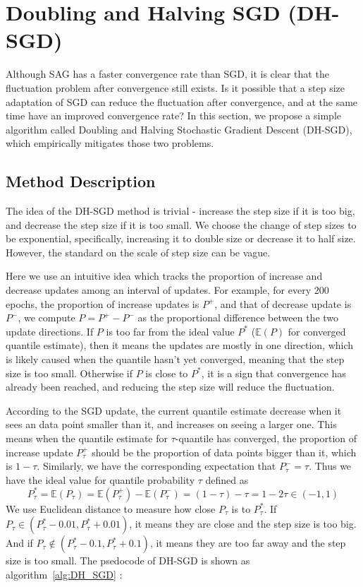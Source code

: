 \section{Doubling and Halving SGD (DH-SGD)}
\label{sec: DH_SGD}

Although SAG has a faster convergence rate than SGD, it is clear that the fluctuation problem after convergence still exists. Is it possible that a step size adaptation of SGD can reduce the fluctuation after convergence, and at the same time have an improved convergence rate? In this section, we propose a simple algorithm called Doubling and Halving Stochastic Gradient Descent (DH-SGD), which empirically mitigates those two problems.

\subsection{Method Description}

The idea of the DH-SGD method is trivial - increase the step size if it is too big, and decrease the step size if it is too small. We choose the change of step sizes to be exponential, specifically, increasing it to double size or decrease it to half size. However, the standard on the scale of step size can be vague. 

Here we use an intuitive idea which tracks the proportion of increase and decrease updates among an interval of updates. For example, for every 200 epochs, the proportion of increase updates is $P^+$, and that of decrease update is $P^-$, we compute $P = P^+ - P^-$ as the proportional difference between the two update directions. If $P$ is too far from the ideal value $P^*$ ($\mathbb{E}(P)$ for converged quantile estimate), then it means the updates are mostly in one direction, which is likely caused when the quantile hasn't yet converged, meaning that the step size is too small. Otherwise if $P$ is close to $P^*$, it is a sign that convergence has already been reached, and reducing the step size will reduce the fluctuation. 

According to the SGD update, the current quantile estimate decrease when it sees an data point smaller than it, and increases on seeing a larger one.
This means when the quantile estimate for $\tau$-quantile has converged, the proportion of increase update $P^+_\tau$ should be the proportion of data points bigger than it, which is $1-\tau$. Similarly, we have the corresponding expectation that $P^-_\tau = \tau$.
Thus we have the ideal value for quantile probability $\tau$ defined as
\begin{equation}
    P^*_\tau = \mathbb{E}(P_\tau) = \mathbb{E}(P^+_\tau) - \mathbb{E}(P^-_\tau) = (1-\tau) - \tau = 1 - 2\tau \in (-1, 1)
\end{equation}
We use Euclidean distance to measure how close $P_\tau$ is to $P_\tau^*$. If $P_\tau \in (P^*_\tau- 0.01, P^*_\tau+ 0.01)$, it means they are close and the step size is too big. And if $P_\tau \not\in (P^*_\tau- 0.1, P^*_\tau+ 0.1)$, it means they are too far away and the step size is too small. 
The psedocode of DH-SGD is shown as algorithm~\ref{alg:DH_SGD} :

